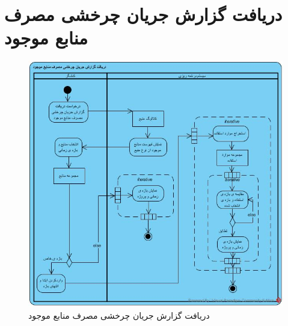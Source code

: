 \section{دریافت گزارش جریان چرخشی مصرف منابع موجود}
\begin{figure}[H]
	\centering
	\includegraphics[scale=0.7]{img/activity/UsageFlowReport}
	\caption{دریافت گزارش جریان چرخشی مصرف منابع موجود}
\end{figure}

